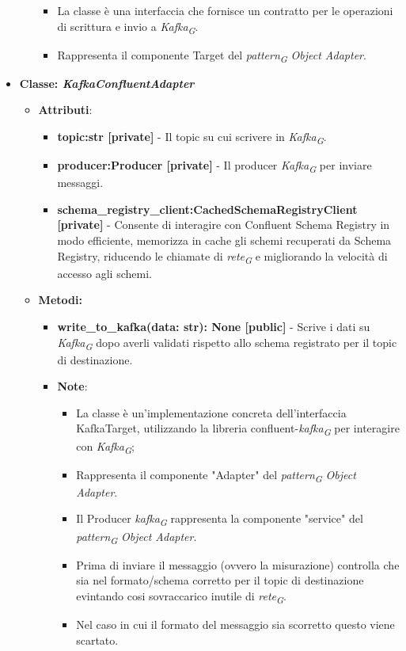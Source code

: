 \begin{itemize}
\begin{itemize}
\begin{itemize}
            \item La classe è una interfaccia che fornisce un contratto per le operazioni di scrittura e invio a \textit{Kafka}\textsubscript{\textit{G}}.
            \item Rappresenta il componente Target del \textit{pattern}\textsubscript{\textit{G}} \textit{Object Adapter}.
        \end{itemize}
    \end{itemize}
    \item{\textbf{Classe: \textit{KafkaConfluentAdapter}}}
    \begin{itemize}
    \item\textbf{Attributi}:
        \begin{itemize}
        \item \textbf{topic:str [private]} - Il topic su cui scrivere in \textit{Kafka}\textsubscript{\textit{G}}.
        \item \textbf{producer:Producer [private]} - Il producer \textit{Kafka}\textsubscript{\textit{G}} per inviare messaggi.
        \item \textbf{schema\_registry\_client:CachedSchemaRegistryClient [private]} - Consente di interagire con Confluent Schema Registry in modo efficiente, memorizza in cache gli schemi recuperati da Schema Registry, riducendo le chiamate di \textit{rete}\textsubscript{\textit{G}} e migliorando la velocità di accesso agli schemi.
    \end{itemize}
    \item \textbf{Metodi: }
    \begin{itemize}
        \item \textbf{write\_to\_kafka(data: str): None [public]} - Scrive i dati su \textit{Kafka}\textsubscript{\textit{G}} dopo averli validati rispetto allo schema registrato per il topic di destinazione.
    \item\textbf{Note}:
        \begin{itemize}
            \item La classe è un'implementazione concreta dell'interfaccia KafkaTarget, utilizzando la libreria confluent-\textit{kafka}\textsubscript{\textit{G}} per interagire con \textit{Kafka}\textsubscript{\textit{G}};
            \item Rappresenta il componente "Adapter" del \textit{pattern}\textsubscript{\textit{G}} \textit{Object Adapter}.
            \item Il Producer \textit{kafka}\textsubscript{\textit{G}} rappresenta la componente "service" del \textit{pattern}\textsubscript{\textit{G}} \textit{Object Adapter}.
            \item Prima di inviare il messaggio  (ovvero la misurazione) controlla che sia nel formato/schema corretto per il topic di destinazione evintando cosi sovraccarico inutile di \textit{rete}\textsubscript{\textit{G}}.
            \item Nel caso in cui il formato del messaggio sia scorretto questo viene scartato.
        \end{itemize}
    \end{itemize}
\end{itemize}


\end{itemize}

